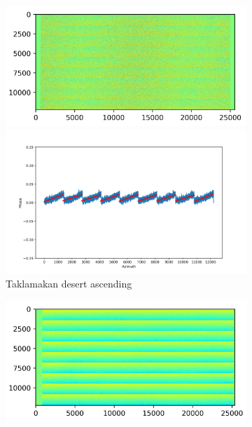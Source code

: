 \documentclass[preprint, authoryear]{elsarticle}
\begin{document}
\begin{figure}
    \centering
    \begin{subfigure}[c]{0.5\textwidth}
        \centering
        \begin{minipage}[c]{0.5\textwidth}
            \centering
            \includegraphics[width=\textwidth]{figure/The cross-interferogram/cross_interf_TaklimakanDesert_asc.png}
        \end{minipage}%
        \begin{minipage}[c]{0.5\textwidth}
            \centering
            \includegraphics[width=\textwidth]{figure/The cross-interferogram/cross_interf_TaklimakanDesert_asc_row&fitted_20230102.png}
        \end{minipage}
        \caption{Taklamakan desert ascending}
        \label{fig_5a}
    \end{subfigure}%
    \begin{subfigure}[c]{0.5\textwidth}
        \centering
        \begin{minipage}[c]{0.5\textwidth}
            \centering
            \includegraphics[width=\textwidth]{figure/The cross-interferogram/cross_interf_TaklimakanDesert_des.png}

\end{minipage}
\end{subfigure}
\end{figure}
\end{document}
